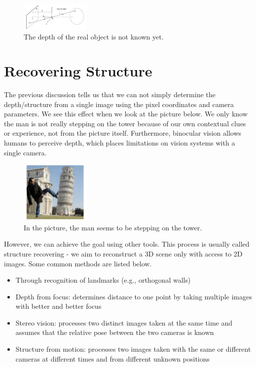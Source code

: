 \documentclass[]{article}
\begin{document}
\begin{figure}[H]
\includegraphics[width=0.3\textwidth]{measuring_depth.png}
\centering
\caption{The depth of the real object is not known yet.}
\label{fig:measuring_depth}
\end{figure}

\section{Recovering Structure}
The previous discussion tells us that we can not simply determine the depth/structure from a single image using the pixel coordinates and camera parameters. We see this effect when we look at the picture below. We only know the man is not really stepping on the tower because of our own contextual clues or experience, not from the picture itself. Furthermore, binocular vision allows humans to perceive depth, which places limitations on vision systems with a single camera.

\begin{figure}[H]
\includegraphics[width=0.3\textwidth]{stepping_on_tower.png}
\centering
\caption{In the picture, the man seems to be stepping on the tower.}
\label{fig:stepping_on_tower}
\end{figure}

However, we can achieve the goal using other tools. This process is usually called structure recovering - we aim to reconstruct a 3D scene only with access to 2D images. Some common methods are listed below.

\begin{itemize}
  \item Through	recognition of landmarks (e.g., orthogonal walls)
  \item Depth from focus: determines distance to one point by taking multiple images with better and better focus
  \item Stereo vision: processes two distinct images taken at the same time and assumes that the relative pose between the two cameras is known
  \item Structure from motion: processes two images taken with the same or different cameras at different times and from different unknown positions
\end{itemize}
\end{document}
